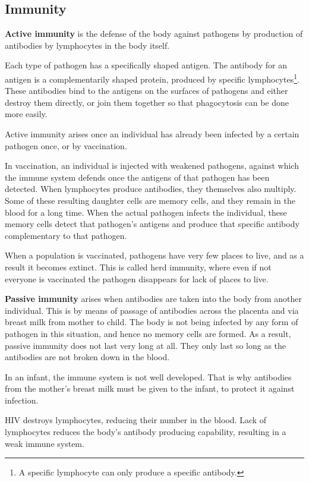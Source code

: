 \subsection{Immunity}
\textbf{Active immunity} is the defense of the body against pathogens by production of antibodies
by lymphocytes in the body itself.

Each type of pathogen has a specifically shaped antigen. The antibody for an antigen is a 
complementarily shaped protein, produced by specific lymphocytes\footnote{A specific lymphocyte
can only produce a specific antibody.}. These antibodies bind to the antigens on the surfaces
of pathogens and either destroy them directly, or join them together so that phagocytosis can be
done more easily.

Active immunity arises once an individual has already been infected by a certain pathogen once, or
by vaccination. 

In vaccination, an individual is injected with weakened pathogens, against which
the immune system defends once the antigens of that pathogen has been detected. When lymphocytes
produce antibodies, they themselves also multiply. Some of these resulting daughter cells are 
memory cells, and they remain in the blood for a long time. When the actual pathogen infects the
individual, these memory cells detect that pathogen's antigens and produce that specific antibody
complementary to that pathogen.

When a population is vaccinated, pathogens have very few places to live, and as a result it becomes
extinct. This is called herd immunity, where even if not everyone is vaccinated the pathogen 
disappears for lack of places to live.

\textbf{Passive immunity} arises when antibodies are taken into the body from another individual.
This is by means of passage of antibodies across the placenta and via breast milk from mother to
child. The body is not being infected by any form of pathogen in this situation, and hence no
memory cells are formed. As a result, passive immunity does not last very long at all. They only
last so long as the antibodies are not broken down in the blood.

In an infant, the immune system is not well developed. That is why antibodies from the mother's
breast milk must be given to the infant, to protect it against infection.

HIV destroys lymphocytes, reducing their number in the blood. Lack of lymphocytes reduces the body's
antibody producing capability, resulting in a weak immune system.

